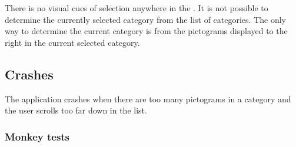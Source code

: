 There is no visual cues of selection anywhere in the \ct. It is not possible to determine the currently selected category from the list of categories. The only way to determine the current category is from the pictograms displayed to the right in the current selected category. 

\subsection{Crashes}

The application crashes when there are too many pictograms in a category and the user scrolls too far down in the list. 

\subsubsection{Monkey tests}

